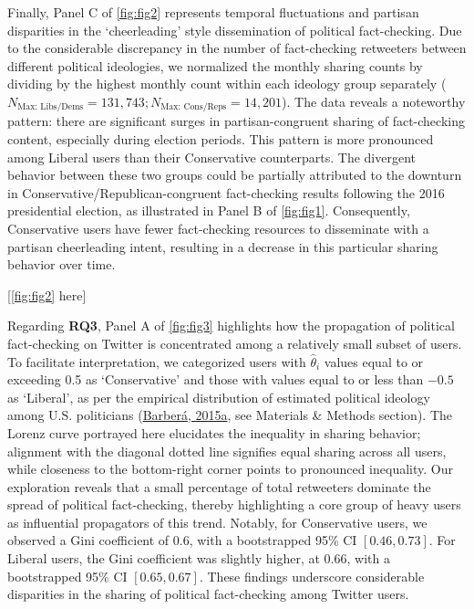 \documentclass[
  12pt,
]{article}
\begin{document}
Finally, Panel C of \autoref{fig:fig2} represents temporal fluctuations
and partisan disparities in the `cheerleading' style dissemination of
political fact-checking. Due to the considerable discrepancy in the
number of fact-checking retweeters between different political
ideologies, we normalized the monthly sharing counts by dividing by the
highest monthly count within each ideology group separately
(\(N_{\text{Max: Libs/Dems}} = 131,743; N_{\text{Max: Cons/Reps}} = 14,201\)).
The data reveals a noteworthy pattern: there are significant surges in
partisan-congruent sharing of fact-checking content, especially during
election periods. This pattern is more pronounced among Liberal users
than their Conservative counterparts. The divergent behavior between
these two groups could be partially attributed to the downturn in
Conservative/Republican-congruent fact-checking results following the
2016 presidential election, as illustrated in Panel B of
\autoref{fig:fig1}. Consequently, Conservative users have fewer
fact-checking resources to disseminate with a partisan cheerleading
intent, resulting in a decrease in this particular sharing behavior over
time.

\begin{center}
[\autoref{fig:fig2} here]
\end{center}

Regarding \textbf{RQ3}, Panel A of \autoref{fig:fig3} highlights how the
propagation of political fact-checking on Twitter is concentrated among
a relatively small subset of users. To facilitate interpretation, we
categorized users with \(\hat{\theta}_i\) values equal to or exceeding
0.5 as `Conservative' and those with values equal to or less than
\(-0.5\) as `Liberal', as per the empirical distribution of estimated
political ideology among U.S. politicians
(\protect\hyperlink{ref-barbera2015birds}{Barberá, 2015a}, see Materials
\& Methods section). The Lorenz curve portrayed here elucidates the
inequality in sharing behavior; alignment with the diagonal dotted line
signifies equal sharing across all users, while closeness to the
bottom-right corner points to pronounced inequality. Our exploration
reveals that a small percentage of total retweeters dominate the spread
of political fact-checking, thereby highlighting a core group of heavy
users as influential propagators of this trend. Notably, for
Conservative users, we observed a Gini coefficient of 0.6, with a
bootstrapped 95\% CI \([0.46, 0.73]\). For Liberal users, the Gini
coefficient was slightly higher, at 0.66, with a bootstrapped 95\% CI
\([0.65, 0.67]\). These findings underscore considerable disparities in
the sharing of political fact-checking among Twitter users.
\end{document}
